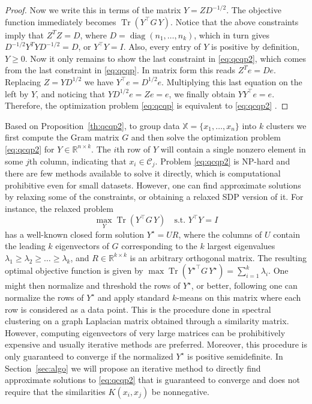 \documentclass[aps,preprint,nofootinbib,floatfix]{revtex4-1}
\DeclareMathOperator{\diag}{diag}
\DeclareMathOperator{\Tr}{Tr}
\newcommand\kk{K}
\newcommand\C{{\mathcal{C}}}
\newcommand\Zt{Y}
\newcommand\e{e}
\begin{document}
\begin{proof}
Now we write this in terms of the matrix $Y = Z D^{-1/2}$.
The objective function immediately becomes
$\Tr\left( Y^\top G \, Y\right)$. Notice that the above constraints
imply that $Z^T Z = D$, where $D=\diag(n_1,\dotsc,n_k)$, which in turn gives
$D^{-1/2} Y^T Y D^{-1/2} = D$, or $Y^\top Y = I$. 
Also, every entry of $Y$ is positive by definition,
$Y \ge 0$. Now it only remains to show the last 
constraint in \eqref{eq:qcqp2}, which comes from the last
constraint in \eqref{eq:qcqp}. In matrix form this reads
$Z^T \e = D \e$. Replacing $Z=YD^{1/2}$ we have
$Y^\top \e = D^{1/2} \e$. Multiplying this last equation
on the left by $Y$, and noticing
that $Y D^{1/2} \e = Z \e = \e$, we finally obtain
$Y Y^\top \e = \e$. Therefore, the optimization 
problem \eqref{eq:qcqp} is equivalent
to \eqref{eq:qcqp2} .
\end{proof}


Based on Proposition~\ref{th:qcqp2}, to group data
$\mathbb{X} = \{ x_1,\dotsc,x_n \}$
into  $k$ clusters we first compute the Gram matrix
$G$ and then 
solve the optimization problem \eqref{eq:qcqp2} for $\Zt \in
\mathbb{R}^{n\times k}$. The $i$th row
of $\Zt$ will contain a single nonzero element in some $j$th column,
indicating that $x_i \in \C_j$. 
Problem \eqref{eq:qcqp2} is NP-hard and there
are few methods
available to solve it directly,
which is computational prohibitive even for small datasets.
However, one can find approximate solutions by relaxing some 
of the constraints, or obtaining a relaxed SDP version of it.
For instance, the relaxed problem
\begin{equation}
\max_{Y} \Tr \left( Y^\top G \, Y \right) \quad \mbox{s.t. $Y^\top Y = I$}
\end{equation}
has a well-known closed form solution $Y^\star = U R$, where the
columns of $U$ contain the leading $k$ eigenvectors of $G$ corresponding
to the $k$ largest eigenvalues $\lambda_1\ge \lambda_2\ge\dotsc\ge\lambda_k$, 
and
$R \in \mathbb{R}^{k\times k}$ is an arbitrary orthogonal matrix. 
The resulting
optimal objective function is given by
$\max \Tr \left( {Y^\star}^\top G \, Y^\star \right)  = 
\sum_{i=1}^k \lambda_i$. One might then normalize and threshold the rows
of $Y^\star$,
 or better, following \cite{NgJordan} one can normalize the
rows of $Y^\star$ and apply standard $k$-means on this matrix where each
row is considered as a data point.
This is the procedure done in spectral clustering on a graph Laplacian
matrix obtained through a similarity matrix.
However, computing eigenvectors of very large matrices
can be prohibitively expensive 
and usually iterative methods are preferred. Moreover,
this procedure is only guaranteed to converge if the normalized $Y^\star$ is
positive semidefinite.
In Section~\ref{sec:algo} we will propose an iterative method to directly 
find approximate solutions to \eqref{eq:qcqp2} that is guaranteed to
converge and does not require that the similarities $\kk(x_i,x_j)$ be
nonnegative.
\end{document}
